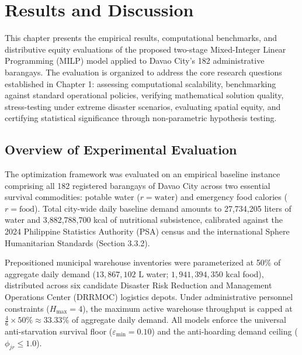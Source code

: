 \chapter{Results and Discussion}
\label{ch:results_and_discussion}

This chapter presents the empirical results, computational benchmarks, and distributive equity evaluations of the proposed two-stage Mixed-Integer Linear Programming (MILP) model applied to Davao City's 182 administrative barangays. The evaluation is organized to address the core research questions established in Chapter 1: assessing computational scalability, benchmarking against standard operational policies, verifying mathematical solution quality, stress-testing under extreme disaster scenarios, evaluating spatial equity, and certifying statistical significance through non-parametric hypothesis testing.

\section{Overview of Experimental Evaluation}
\label{sec:results_overview}

The optimization framework was evaluated on an empirical baseline instance comprising all 182 registered barangays of Davao City across two essential survival commodities: potable water ($r = \text{water}$) and emergency food calories ($r = \text{food}$). Total city-wide daily baseline demand amounts to 27,734,205 liters of water and 3,882,788,700 kcal of nutritional subsistence, calibrated against the 2024 Philippine Statistics Authority (PSA) census and the international Sphere Humanitarian Standards (Section 3.3.2). 

Prepositioned municipal warehouse inventories were parameterized at 50\% of aggregate daily demand ($13{,}867{,}102\text{ L}$ water; $1{,}941{,}394{,}350\text{ kcal}$ food), distributed across six candidate Disaster Risk Reduction and Management Operations Center (DRRMOC) logistics depots. Under administrative personnel constraints ($H_{\max} = 4$), the maximum active warehouse throughput is capped at $\frac{4}{6} \times 50\% \approx 33.33\%$ of aggregate daily demand. All models enforce the universal anti-starvation survival floor ($\varepsilon_{\min} = 0.10$) and the anti-hoarding demand ceiling ($\phi_{jr} \le 1.0$).

